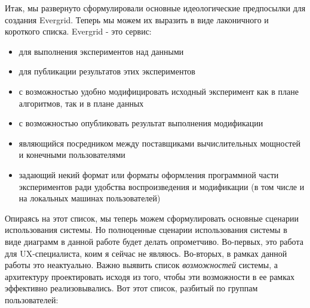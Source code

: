 Итак, мы развернуто сформулировали основные идеологические предпосылки для создания Evergrid. Теперь мы можем их выразить в виде лаконичного и короткого списка. Evergrid - это сервис:

\begin{itemize}
	\item для выполнения экспериментов над данными
	\item для публикации результатов этих экспериментов
	\item с возможностью удобно модифицировать исходный эксперимент как в плане алгоритмов, так и в плане данных
	\item с возможностью опубликовать результат выполнения модификации
	\item являющийся посредником между поставщиками вычислительных мощностей и конечными пользователями
	\item задающий некий формат или форматы оформления программной части экспериментов ради удобства воспроизведения и модификации (в том числе и на локальных машинах пользователей)
\end{itemize}

Опираясь на этот список, мы теперь можем сформулировать основные сценарии использования системы. Но полноценные сценарии использования системы в виде диаграмм в данной работе будет делать опрометчиво. Во-первых, это работа для UX-специалиста, коим я сейчас не являюсь. Во-вторых, в рамках данной работы это неактуально. Важно выявить список \textit{возможностей} системы, а архитектуру проектировать исходя из того, чтобы эти возможности в ее рамках эффективно реализовывались. Вот этот список, разбитый по группам пользователей:

